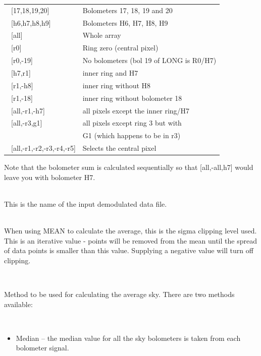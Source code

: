 \documentclass[twoside,11pt]{article}
\renewcommand{\_}{\texttt{\symbol{95}}}
\newcommand{\sstsubsection}[1]{ \item[{#1}] \mbox{} \\}
\newcommand{\sstitemlist}[1]{
  \mbox{} \\
  \vspace{-3.5ex}
  \begin{itemize}
     #1
  \end{itemize}
}
\newcommand{\sstitem}{\item}
\newcommand{\sstsubsection}[1]{\item[{#1}]}
\newcommand{\sstitemlist}[1]{
      \begin{itemize}
         #1
      \end{itemize}
      \\
   }
\newcommand{\sstitem}{\item}
\begin{document}
{{{\begin{tabular}{ll}
 \ [17,18,19,20]  &                  Bolometers 17, 18, 19 and 20\\
 \ [h6,h7,h8,h9]  &                  Bolometers H6, H7, H8, H9 \\
 \ [all]          &                  Whole array \\
 \ [r0]           &                  Ring zero (central pixel)\\
 \ [r0,-19]       &                  No bolometers (bol 19 of LONG is R0/H7)\\
 \ [h7,r1]        &                  inner ring and H7\\
 \ [r1,-h8]       &                  inner ring without H8\\
 \ [r1,-18]       &                  inner ring without bolometer 18\\
 \ [all,-r1,-h7]  &                  all pixels except the inner ring/H7\\
 \ [all,-r3,g1]   &                  all pixels except ring 3 but with\\
   &                                      G1 (which happens to be in r3)\\
 \ [all,-r1,-r2,-r3,-r4,-r5]  &      Selects the central pixel \\            

 \end{tabular}

Note that the bolometer sum is calculated sequentially so that [all,-all,h7]
would leave you with bolometer H7.

      }
      \sstsubsection{
         IN = NDF (Read)
      }{
         This is the name of the input demodulated data file.
      }
      \sstsubsection{
         ITER\_SIGMA = REAL (Read)
      }{
         When using MEAN to calculate the average, this is the sigma clipping
         level used. This is an iterative value - points will be removed
         from the mean until the spread of data points is smaller than
         this value. Supplying a negative value  will turn off clipping.
      }
      \sstsubsection{
         MODE = CHAR (Read)
      }{
         Method to be used for calculating the average sky. There are
         two methods available:
         \sstitemlist{

            \sstitem
            Median -- the median value for all the sky bolometers is taken
                       from each bolometer signal.

}}}}
\end{document}

